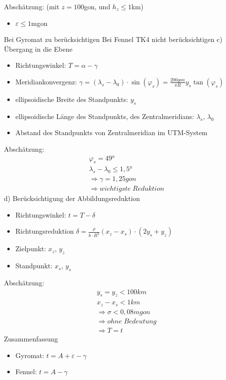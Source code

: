 \documentclass[12pt]{article}
\begin{document}
Abschätzung: (mit $z=100$gon, und $h_z \leq 1$km)
\begin{itemize}
	\item $\varepsilon \leq 1$mgon
\end{itemize}
Bei Gyromat zu berücksichtigen \newline
Bei Fennel TK4 nicht berücksichtigen \newline
\newline
c) Übergang in die Ebene
\begin{itemize}
	\item Richtungswinkel: $T = \alpha - \gamma$
	\item Meridiankonvergenz: $\gamma = (\lambda_s - \lambda_0) \cdot \sin(\varphi_s) = \frac{200gon}{\pi R} y_s \tan(\varphi_s)$
	\item ellipsoidische Breite des Standpunkts: $y_s$
	\item ellipsoidische Länge des Standpunkts, des Zentralmeridians: $\lambda_s$, $\lambda_0$
	\item Abstand des Standpunkts von Zentralmeridian im UTM-System
\end{itemize}
Abschätzung:
\begin{gather*}
	\varphi_s = 49° \\
	\lambda_s - \lambda_0 \leq 1,5° \\
	\Rightarrow \gamma = 1,25gon \\
	\Rightarrow wichtigste\; Reduktion
\end{gather*}
d) Berücksichtigung der Abbildungsreduktion
\begin{itemize}
	\item Richtungswinkel: $t = T - \delta$
	\item Richtungsreduktion $\delta = \frac{\rho}{b \cdot R^2} (x_z - x_s) \cdot (2y_s + y_z)$
	\item Zielpunkt: $x_z$, $y_z$
	\item Standpunkt: $x_s$, $y_s$
\end{itemize}
Abschätzung:
\begin{gather*}
	y_s = y_z < 100km \\
	x_z - x_s < 1km \\
	\Rightarrow \sigma < 0,08mgon \\
	\Rightarrow ohne\; Bedeutung \\
	\Rightarrow T = t
\end{gather*}
Zusammenfassung
\begin{itemize}
	\item Gyromat: $t = A + \varepsilon - \gamma$
	\item Fennel: $t = A - \gamma$
\end{itemize}
\end{document}
